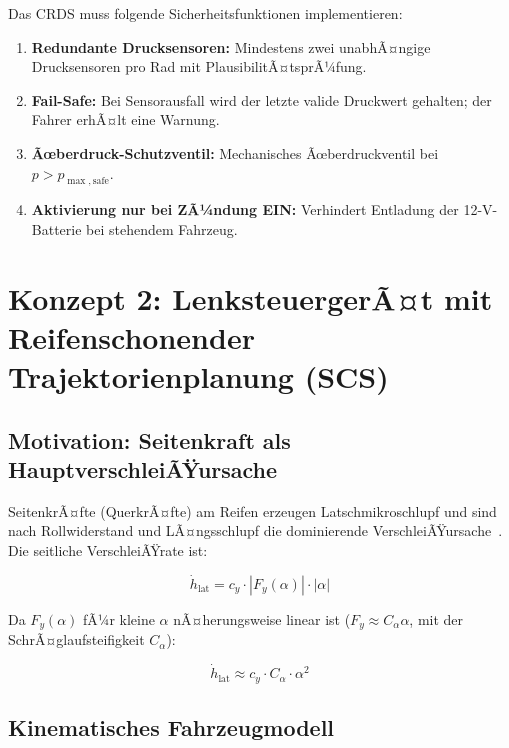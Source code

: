 ﻿\documentclass[12pt,a4paper]{article}
\theoremstyle{definition}
\theoremstyle{remark}
\begin{document}
Das CRDS muss folgende Sicherheitsfunktionen implementieren:

\begin{enumerate}
  \item \textbf{Redundante Drucksensoren:} Mindestens zwei unabhÃ¤ngige Drucksensoren
        pro Rad mit PlausibilitÃ¤tsprÃ¼fung.
  \item \textbf{Fail-Safe:} Bei Sensorausfall wird der letzte valide Druckwert
        gehalten; der Fahrer erhÃ¤lt eine Warnung.
  \item \textbf{Ãœberdruck-Schutzventil:} Mechanisches Ãœberdruckventil bei
        $p > p_{\max,\mathrm{safe}}$.
  \item \textbf{Aktivierung nur bei ZÃ¼ndung EIN:} Verhindert Entladung der
        12-V-Batterie bei stehendem Fahrzeug.
\end{enumerate}

\section{Konzept 2: LenksteuergerÃ¤t mit Reifenschonender Trajektorienplanung (SCS)}
\label{sec:scs}

\subsection{Motivation: Seitenkraft als HauptverschleiÃŸursache}

SeitenkrÃ¤fte (QuerkrÃ¤fte) am Reifen erzeugen Latschmikroschlupf und sind
nach Rollwiderstand und LÃ¤ngsschlupf die dominierende VerschleiÃŸursache~\cite{Niskanen2014}.
Die seitliche VerschleiÃŸrate ist:

\begin{equation}
  \dot{h}_{\mathrm{lat}} = c_y \cdot |F_y(\alpha)| \cdot |\alpha|
  \label{eq:wear_lat}
\end{equation}

Da $F_y(\alpha)$ fÃ¼r kleine $\alpha$ nÃ¤herungsweise linear ist ($F_y \approx C_\alpha \alpha$,
mit der SchrÃ¤glaufsteifigkeit $C_\alpha$):

\begin{equation}
  \dot{h}_{\mathrm{lat}} \approx c_y \cdot C_\alpha \cdot \alpha^2
  \label{eq:wear_lat_lin}
\end{equation}

\subsection{Kinematisches Fahrzeugmodell}
\end{document}
